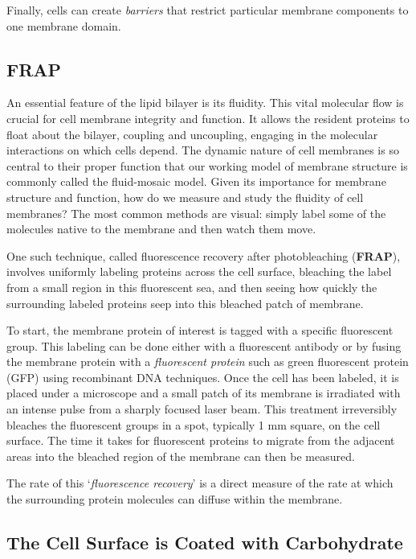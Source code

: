 Finally, cells can create \textit{barriers} that restrict particular membrane components
to one membrane domain.

\subsection{FRAP}

An essential feature of the lipid bilayer is its fluidity. This
vital molecular flow is crucial for cell membrane integrity and function.
It allows the resident proteins to float
about the bilayer, coupling and uncoupling, engaging in
the molecular interactions on which cells depend. The
dynamic nature of cell membranes is so central to their
proper function that our working model of membrane
structure is commonly called the fluid-mosaic model.
Given its importance for membrane structure and function,
how do we measure and study the fluidity of cell
membranes? The most common methods are visual:
simply label some of the molecules native to the membrane and then watch them move.

One such technique, called fluorescence recovery after
photobleaching (\textbf{FRAP}), involves uniformly labeling proteins
across the cell surface, bleaching the label from a
small region in this fluorescent sea, and then seeing how
quickly the surrounding labeled proteins seep into this
bleached patch of membrane.

To start, the membrane
protein of interest is tagged with a specific fluorescent
group. This labeling can be done either with a fluorescent
antibody or by fusing the membrane protein with
a \textit{fluorescent protein} such as green fluorescent protein
(GFP) using recombinant DNA techniques.
Once the cell has been labeled, it is placed under a
microscope and a small patch of its membrane is irradiated
with an intense pulse from a sharply focused laser
beam. This treatment irreversibly bleaches the fluorescent
groups in a spot, typically 1 mm square, on the cell surface.
The time it takes for fluorescent
proteins to migrate from the adjacent areas into the
bleached region of the membrane can then be measured. 

The rate of this ‘\textit{fluorescence recovery}’ is a direct
measure of the rate at which the surrounding protein
molecules can diffuse within the membrane.

\subsection{The Cell Surface is Coated with Carbohydrate}

